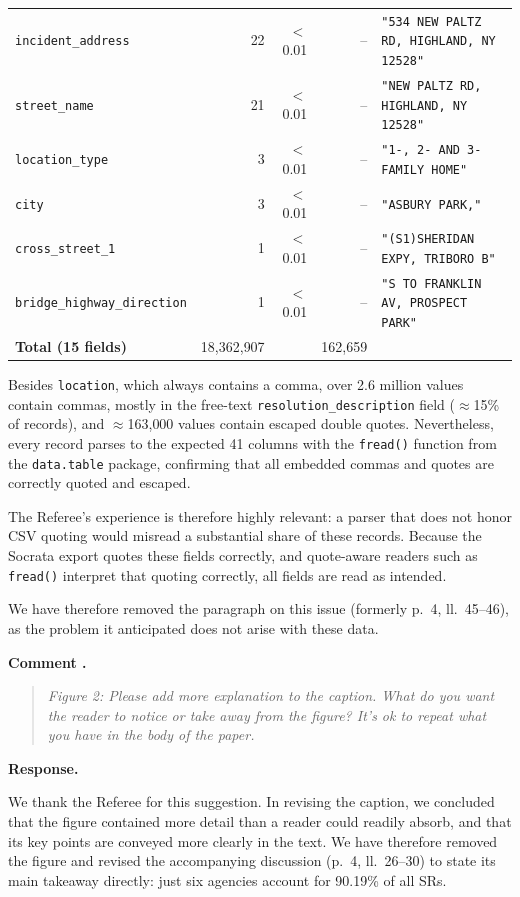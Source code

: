\documentclass[11pt]{article}
\newcounter{refcomment}
\newcommand{\refcomment}[1]{%
  \FloatBarrier
  \stepcounter{refcomment}%
  \par\medskip
  \noindent\textbf{Comment \therefcomment.}
  \begin{quote}\itshape #1\end{quote}
  \noindent\textbf{Response.}~}
\begin{document}
\begin{table}[htbp]
\begin{tabularx}{\textwidth}{@{}lrrr>{\raggedright\arraybackslash}X@{}}
\texttt{incident\_address} & 22 & $<$0.01 & -- & \texttt{"534 NEW PALTZ RD, HIGHLAND, NY 12528"} \\
\texttt{street\_name} & 21 & $<$0.01 & -- & \texttt{"NEW PALTZ RD, HIGHLAND, NY 12528"} \\
\texttt{location\_type} & 3 & $<$0.01 & -- & \texttt{"1-, 2- AND 3- FAMILY HOME"} \\
\texttt{city} & 3 & $<$0.01 & -- & \texttt{"ASBURY PARK,"} \\
\texttt{cross\_street\_1} & 1 & $<$0.01 & -- & \texttt{"(S1)SHERIDAN EXPY, TRIBORO B"} \\
\texttt{bridge\_highway\_direction} & 1 & $<$0.01 & -- & \texttt{"S TO FRANKLIN AV, PROSPECT PARK"} \\
\midrule
\textbf{Total (15 fields)} & 18{,}362{,}907 & & 162{,}659 & \\
\bottomrule
\end{tabularx}
\end{table}


Besides \texttt{location}, which always contains a comma, over 2.6
million values contain commas, mostly in the free-text
\texttt{resolution\_description} field ($\approx$15\% of records), and
$\approx$163{,}000 values contain escaped double quotes. Nevertheless,
every record parses to the expected 41 columns with the
\texttt{fread()} function from the \texttt{data.table} package,
confirming that all embedded commas and quotes are correctly quoted and
escaped.

The Referee's experience is therefore highly relevant: a parser that
does not honor CSV quoting would misread a substantial share of these
records. Because the Socrata export quotes these fields correctly, and
quote-aware readers such as \texttt{fread()} \citep{datatable2025} interpret 
that quoting correctly, all fields are read as intended. 

We have therefore removed the paragraph on this 
issue (formerly p.~4, ll.~45--46), as the problem
it anticipated does not arise with these data.

\refcomment{Figure 2: Please add more explanation to the caption. What
do you want the reader to notice or take away from the figure? It's ok
to repeat what you have in the body of the paper.}

We thank the Referee for this suggestion. In revising the caption, we
concluded that the figure contained more detail than a reader could
readily absorb, and that its key points are conveyed more clearly in
the text. We have therefore removed the figure and revised the
accompanying discussion (p.~4, ll.~26--30) to state its main takeaway
directly: just six agencies account for 90.19\% of all SRs.
\end{document}

